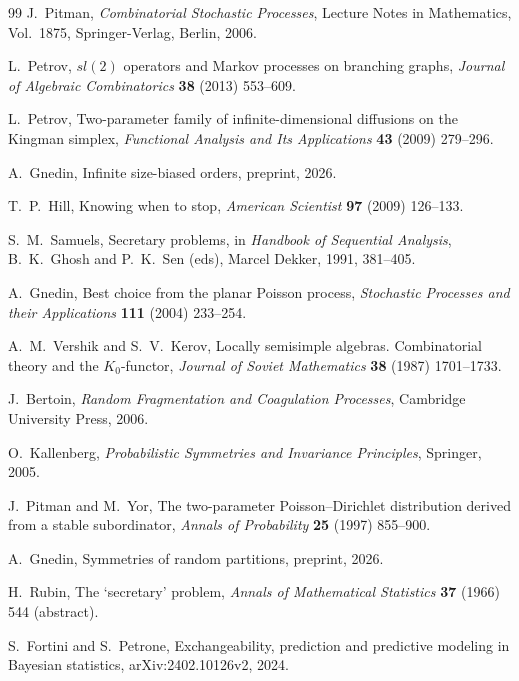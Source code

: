 \documentclass[11pt,reqno]{amsart}
\theoremstyle{definition}
\theoremstyle{remark}
\numberwithin{equation}{section}
\begin{document}
\begin{thebibliography}{99}
J.~Pitman,
\textit{Combinatorial Stochastic Processes},
Lecture Notes in Mathematics, Vol.~1875, Springer-Verlag, Berlin, 2006.

L.~Petrov,
\(sl(2)\) operators and Markov processes on branching graphs,
\textit{Journal of Algebraic Combinatorics} \textbf{38} (2013) 553--609.

L.~Petrov,
Two-parameter family of infinite-dimensional diffusions on the Kingman simplex,
\textit{Functional Analysis and Its Applications} \textbf{43} (2009) 279--296.

A.~Gnedin,
Infinite size-biased orders,
preprint, 2026.

T.~P.~Hill,
Knowing when to stop,
\textit{American Scientist} \textbf{97} (2009) 126--133.

S.~M.~Samuels,
Secretary problems,
in \textit{Handbook of Sequential Analysis}, B.~K.~Ghosh and P.~K.~Sen (eds), Marcel Dekker, 1991, 381--405.

A.~Gnedin,
Best choice from the planar Poisson process,
\textit{Stochastic Processes and their Applications} \textbf{111} (2004) 233--254.

A.~M.~Vershik and S.~V.~Kerov,
Locally semisimple algebras. Combinatorial theory and the \(K_0\)-functor,
\textit{Journal of Soviet Mathematics} \textbf{38} (1987) 1701--1733.

J.~Bertoin,
\textit{Random Fragmentation and Coagulation Processes},
Cambridge University Press, 2006.

O.~Kallenberg,
\textit{Probabilistic Symmetries and Invariance Principles},
Springer, 2005.

J.~Pitman and M.~Yor,
The two-parameter Poisson--Dirichlet distribution derived from a stable subordinator,
\textit{Annals of Probability} \textbf{25} (1997) 855--900.

A.~Gnedin,
Symmetries of random partitions,
preprint, 2026.

H.~Rubin,
The `secretary' problem,
\textit{Annals of Mathematical Statistics} \textbf{37} (1966) 544 (abstract).

S.~Fortini and S.~Petrone,
Exchangeability, prediction and predictive modeling in Bayesian statistics,
arXiv:2402.10126v2, 2024.

\end{thebibliography}
\end{document}
